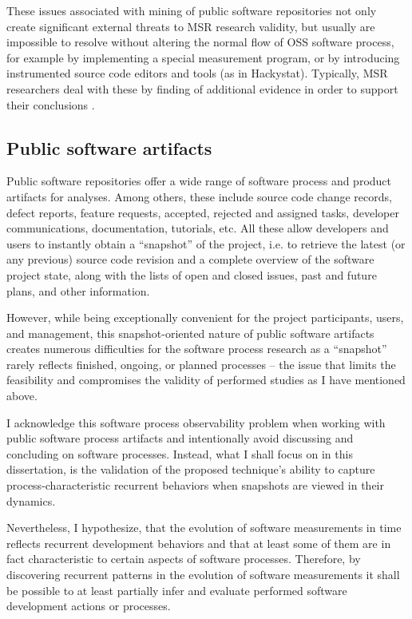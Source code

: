 These issues associated with mining of public software repositories not only create significant external threats to 
MSR research validity, but usually are impossible to resolve without altering the normal flow of OSS software 
process, for example by implementing a special measurement program, or by introducing instrumented source code 
editors and tools (as in Hackystat). 
Typically, MSR researchers deal with these by finding of additional evidence in order to support their conclusions 
\cite{citeulike:5043664} \cite{citeulike:5128808}.

\subsection{Public software artifacts}
Public software repositories offer a wide range of software process and product artifacts for analyses.
Among others, these include source code change records, defect reports, feature requests, accepted, 
rejected and assigned tasks, developer communications, documentation, tutorials, etc. 
All these allow developers and users to instantly obtain a ``snapshot'' of the project, i.e. to retrieve the 
latest (or any previous) source code revision and a complete overview of the software project state,
along with the lists of open and closed issues, past and future plans, and other information.

However, while being exceptionally convenient for the project participants, users, and management, this 
snapshot-oriented nature of public software artifacts creates numerous difficulties for the software process research 
as a ``snapshot'' rarely reflects finished, ongoing, or planned processes -- the issue that limits the feasibility and 
compromises the validity of performed studies as I have mentioned above. 

I acknowledge this software process observability problem when working with public software process artifacts and intentionally 
avoid discussing and concluding on software processes. Instead, what I shall focus on in this dissertation, is the 
validation of the proposed technique's ability to capture process-characteristic recurrent behaviors when snapshots 
are viewed in their dynamics. 

Nevertheless, I hypothesize, that the evolution of software measurements in time reflects recurrent development behaviors 
and that at least some of them are in fact characteristic to certain aspects of software processes. 
Therefore, by discovering recurrent patterns in the evolution of software measurements it shall be possible to at least 
partially infer and evaluate performed software development actions or processes.

